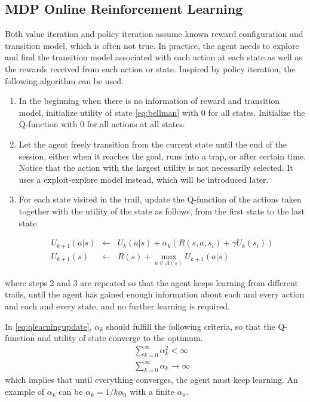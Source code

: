 \subsection{MDP Online Reinforcement Learning}

Both value iteration and policy iteration assume known reward configuration and transition model, which is often not true. In practice, the agent needs to explore and find the transition model associated with each action at each state as well as the rewards received from each action or state. Inspired by policy iteration, the following  algorithm can be used.

\begin{enumerate}
	\item In the beginning when there is no information of reward and transition model, initialize utility of state \eqref{eq:bellman} with $0$ for all states. Initialize the Q-function with $0$ for all actions at all states.
	\item Let the agent freely transition from the current state until the end of the session, either when it reaches the goal, runs into a trap, or after certain time. Notice that the action with the largest utility is not necessarily selected. It uses a exploit-explore model instead, which will be introduced later.
	\item For each state visited in the trail, update the Q-function of the actions taken together with the utility of the state as follows, from the first state to the last state.
	
	\begin{eqnarray}
		U_{k+1}(a|s) &\leftarrow& U_k(a|s) + \alpha_k\left(R(s,a,s_i) + \gamma U_k(s_i)\right) \label{eq:qlearningupdate} \\
		U_{k+1}(s) &\leftarrow& R(s) + \max_{a\in A(s)} U_{k+1}(a|s) \nonumber
	\end{eqnarray}

\end{enumerate}
where steps 2 and 3 are repeated so that the agent keeps learning from different trails, until the agent has gained enough information about each and every action and each and every state, and no further learning is required.

In \eqref{eq:qlearningupdate}, $\alpha_k$ should fulfill the following criteria, so that the Q-function and utility of state converge to the optimum.
\begin{eqnarray}
	&& \sum_{k=0}^{\infty} \alpha_k^2 < \infty \nonumber \\
	&& \sum_{k=0}^{\infty} \alpha_k \rightarrow \infty \nonumber
\end{eqnarray}
which implies that until everything converges, the agent must keep learning. An example of $\alpha_k$ can be $\alpha_k = 1/k \alpha_0$ with a finite $\alpha_0$.

